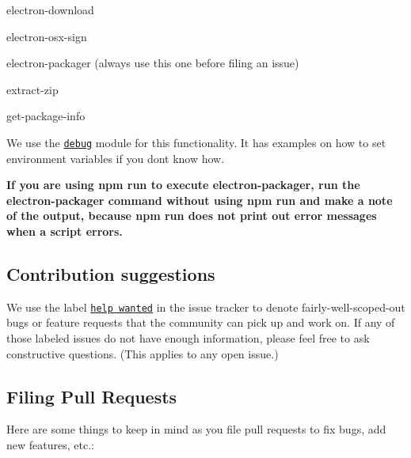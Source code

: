 \begin{DoxyItemize}
\item {\ttfamily electron-\/download}
\item {\ttfamily electron-\/osx-\/sign}
\item {\ttfamily electron-\/packager} (always use this one before filing an issue)
\item {\ttfamily extract-\/zip}
\item {\ttfamily get-\/package-\/info}
\end{DoxyItemize}

We use the \href{https://www.npmjs.com/package/debug#usage}{\tt {\ttfamily debug}} module for this functionality. It has examples on how to set environment variables if you don\textquotesingle{}t know how.

{\bfseries If you are using {\ttfamily npm run} to execute {\ttfamily electron-\/packager}, run the {\ttfamily electron-\/packager} command without using {\ttfamily npm run} and make a note of the output, because {\ttfamily npm run} does not print out error messages when a script errors.}

\subsection*{Contribution suggestions}

We use the label \href{https://github.com/electron-userland/electron-packager/issues?q=is%3Aopen+is%3Aissue+label%3A%22help+wanted%22}{\tt {\ttfamily help wanted}} in the issue tracker to denote fairly-\/well-\/scoped-\/out bugs or feature requests that the community can pick up and work on. If any of those labeled issues do not have enough information, please feel free to ask constructive questions. (This applies to any open issue.)

\subsection*{Filing Pull Requests}

Here are some things to keep in mind as you file pull requests to fix bugs, add new features, etc.\+:


